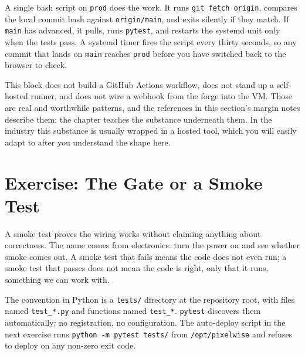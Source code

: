 A single bash script on \texttt{prod} does the work.
It runs \texttt{git fetch origin}, compares the local commit hash against
\texttt{origin/main}, and exits silently if they match.
If \texttt{main} has advanced, it pulls, runs \texttt{pytest}, and
restarts the systemd unit only when the tests pass.
A systemd timer fires the script every thirty seconds, so any
commit that lands on \texttt{main} reaches \texttt{prod} before
you have switched back to the browser to check.

This block does not build a GitHub Actions workflow, does not stand
up a self-hosted runner, and does not wire a webhook from the
forge into the VM.
Those are real and worthwhile patterns, and the references in this
section's margin notes describe them; the chapter teaches the
substance underneath them. In the industry this substance is usually wrapped in a hosted tool, 
which you will easily adapt to after you understand the shape here.


\newpage
\section{Exercise: The Gate or a Smoke Test}

A smoke test proves the wiring works without claiming anything about
correctness.
The name comes from electronics: turn the power on and see whether
smoke comes out.
A smoke test that fails means the code does not even run; a smoke
test that passes does not mean the code is right, only that it
runs, something we can work with.

The convention in Python is a \texttt{tests/} directory at the
repository root, with files named \texttt{test\_*.py} and functions
named \texttt{test\_*}.
\texttt{pytest} discovers them automatically; no registration, no
configuration.
The auto-deploy script in the next exercise runs
\texttt{python -m pytest tests/} from \texttt{/opt/pixelwise} and refuses to
deploy on any non-zero exit code.





